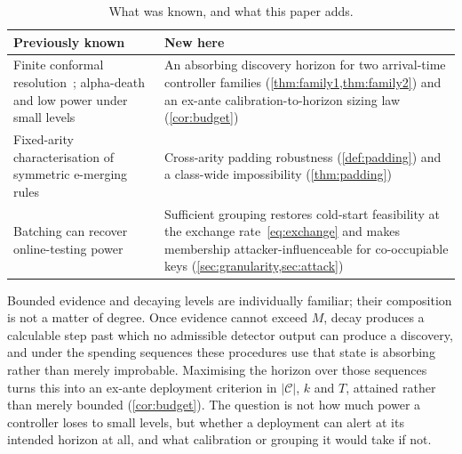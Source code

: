 \documentclass[conference]{IEEEtran}
\newcommand{\Cal}{\mathcal{C}}
\newcommand{\nCal}{\lvert\Cal\rvert}
\newcommand{\ceil}{M}
\begin{document}
\begin{table}[!t]
\centering
\caption{What was known, and what this paper adds.}
\label{tab:knownnew}
\footnotesize
\setlength{\tabcolsep}{4pt}
\begin{tabular}{@{}>{\raggedright\arraybackslash}p{3.85cm}>{\raggedright\arraybackslash}p{4.35cm}@{}}
\toprule
Previously known & New here \\
\midrule
Finite conformal resolution~\cite{vovk2005alrw,hennhofer2026resolution,huo2024realtime}; alpha-death
and low power under small levels~\cite{foster2008alpha,ramdas2017lordpp} & An absorbing discovery
horizon for two arrival-time controller families (\cref{thm:family1,thm:family2}) and an ex-ante
calibration-to-horizon sizing law (\cref{cor:budget}) \\[2pt]
Fixed-arity characterisation of symmetric e-merging rules~\cite{vovk2021evalues} & Cross-arity padding
robustness (\cref{def:padding}) and a class-wide impossibility (\cref{thm:padding}) \\[2pt]
Batching can recover online-testing power~\cite{zrnic2020batching} & Sufficient grouping restores
cold-start feasibility at the exchange rate~\eqref{eq:exchange} and makes membership
attacker-influenceable for co-occupiable keys (\cref{sec:granularity,sec:attack}) \\
\bottomrule
\end{tabular}
\end{table}

Bounded evidence and decaying levels are individually familiar; their composition is not a matter of
degree. Once evidence cannot exceed $\ceil$, decay produces a calculable step past which no admissible
detector output can produce a discovery, and under the spending sequences these procedures use that
state is absorbing rather than merely improbable. Maximising the horizon over those sequences turns this
into an ex-ante deployment criterion in $\nCal$, $k$ and $T$, attained rather than merely bounded
(\cref{cor:budget}). The question is not how much power a controller loses to small levels, but whether
a deployment can alert at its intended horizon at all, and what calibration or grouping it would take
if not.
\end{document}
